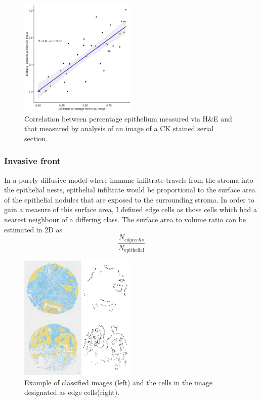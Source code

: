 \begin{figure}
    \centering
    \includegraphics[width=0.5\textwidth]{Chapter3/Figs/correlation_TS_he_Ck.png}
    \caption{Correlation between percentage epithelium measured via H&E and that measured by analysis of an image of a CK stained serial section.}
    \label{fig:correlation_tumourarea}
\end{figure}

\subsubsection*{Invasive front}
In a purely diffusive model where immune infiltrate travels from the stroma into the epithelial nests, epithelial infiltrate would be proportional to the surface area of the epithelial nodules that are exposed to the surrounding stroma. In order to gain a measure of this surface area, I defined edge cells as those cells which had a nearest neighbour of a differing class. The surface area to volume ratio can be estimated in 2D as 
\begin{equation}
    
\frac{N_{edge cells}}{N_{\mathrm{epithelial}}}
\end{equation}

\begin{figure}
    \centering
    \includegraphics[width=0.5\textwidth]{Chapter3/Figs/Thesis-08.png}
    \caption{Example of classified images (left) and the cells in the image designated as edge cells(right).}
    \label{fig:edge_cells}
\end{figure}

